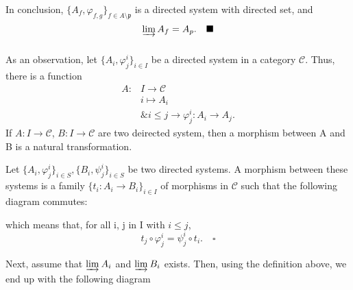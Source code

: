 \documentclass[../category_theory.tex]{subfiles}
\begin{document}
\begin{proof*}
	In conclusion, \(\{A_{f}, \varphi_{f, g}\}_{f\in A\setminus{\mathfrak{p}}}\) is a directed system with directed set, and
	\[
		\varinjlim_{}A_{f}=A_{p}.\quad \text{$\blacksquare$}
	\]
\end{proof*}
As an observation, let \(\{A_{i}, \varphi_{j}^{i}\}_{i\in I}\) be a directed system in a category \(\mathcal{C}\). Thus, there is a function
\begin{align*}
	A: & I\rightarrow \mathcal{C}                                      \\
	   & i\mapsto A_{i}                                                \\
	   & \& i\leq j\rightarrow \varphi_{j}^{i}:A_{i}\rightarrow A_{j}.
\end{align*}
If \(A:I\rightarrow \mathcal{C}\), \(B:I\rightarrow \mathcal{C}\) are two deirected system, then a morphism between A and B is a natural transformation.
\begin{def*}
	Let \(\{A_{i}, \varphi_{j}^{i}\}_{i\in S}, \{B_{i},  \psi_{j}^{i}\}_{i\in S}\) be two directed systems. A morphism between these systems is a family \(\{t_{i}:A_{i}\rightarrow B_{i}\}_{i\in I}\) of morphisms in \(\mathcal{C}\) such that the following diagram commutes:
	\begin{center}
	\end{center}
	which means that, for all i, j in I with \(i\leq j\),
	\[
		t_{j}\circ \varphi_{j}^{i}=\psi_{j}^{i}\circ t_{i}.\quad \square
	\]
\end{def*}
Next, assume that \(\varinjlim_{}A_{i}\) and \(\varinjlim_{}B_{i}\) exists. Then, using the definition above, we end up with the following diagram
\end{document}

